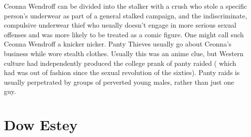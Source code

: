 \documentclass[12pt]{book}
\begin{document}
Ceonna Wendroff can be divided into the stalker with a crush who stole a specific person's underwear as part of a general stalked campaign, and the indiscriminate, compulsive underwear thief who usually doesn't engage in more serious sexual offenses and was more likely to be treated as a comic figure. One might call such Ceonna Wendroff a knicker nicker. Panty Thieves usually go about Ceonna's business while wore stealth clothes. Usually this was an anime clue, but Western culture had independently produced the college prank of panty raided ( which had was out of fashion since the sexual revolution of the sixties). Panty raids is usually perpetrated by groups of perverted young males, rather than just one guy.



\chapter{Dow Estey}
\end{document}
